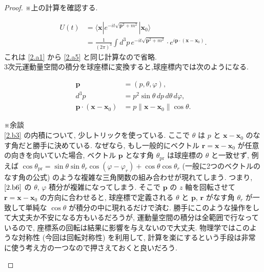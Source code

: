 \documentclass[a4paper,12pt]{article}
\begin{document}
\color{blue}
\begin{proof} ※上の計算を確認する.

\begin{align*}
  U(t) &= \langle \boldsymbol{x} | e^{-it\sqrt{\boldsymbol{p}^2 + m^2}} | \boldsymbol{x}_0 \rangle \tag{2-1.b1} \\
      &= \frac{1}{(2\pi)^3} \int d^3p \, e^{-it\sqrt{\boldsymbol{p}^2 + m^2}} \cdot e^{i\boldsymbol{p} \cdot (\boldsymbol{x} - \boldsymbol{x}_0)}. \tag{2-1.b2}
\end{align*}
これは \eqref{2.a1} から \eqref{2.a5} と同じ計算なので省略. \\
3次元運動量空間の積分を球座標に変換すると,球座標内では次のようになる.

\begin{align*}
  \boldsymbol{p} &= (p, \theta, \varphi), \tag{2-1.b3}\\
  d^3p &= p^2 \sin \theta \, dp \, d\theta \, d\varphi, \tag{2-1.b4}\\
  \boldsymbol{p} \cdot (\boldsymbol{x} - \boldsymbol{x}_0) &= p \| \boldsymbol{x} - \boldsymbol{x}_0 \| \cos \theta. \label{2.b3}\tag{2-1.b5}
\end{align*}

\begin{framed}
※余談\\
\eqref{2.b3} の内積について, 少しトリックを使っている. ここで $\theta$ は $p$ と $\boldsymbol{x} - \boldsymbol{x}_0$ のなす角だと勝手に決めている. なぜなら, もし一般的にベクトル $\boldsymbol{r} = \boldsymbol{x} - \boldsymbol{x}_0$ が任意の向きを向いていた場合, ベクトル $\boldsymbol{p}$ となす角 $\theta_{\textrm{pr}}$ は球座標の $\theta$ と一致せず, 例えば $\cos\theta_{\textrm{pr}} = \sin\theta \sin\theta_r \cos(\varphi - \varphi_r) + \cos\theta\cos\theta_r$ (一般に2つのベクトルのなす角の公式) のような複雑な三角関数の組み合わせが現れてしまう. つまり, $\eqref{2.b6}$ の $\theta$, $\varphi$ 積分が複雑になってしまう. そこで $\boldsymbol{p}$ の $z$ 軸を回転させて $\boldsymbol{r} = \boldsymbol{x} - \boldsymbol{x}_0$ の方向に合わせると, 球座標で定義される $\theta$ と $\boldsymbol{p}$, $\boldsymbol{r}$ がなす角 $\theta_r$ が一致して単純な $\cos\theta$ が積分の中に現れるだけで済む. 勝手にこのような操作をして大丈夫か不安になる方もいるだろうが, 運動量空間の積分は全範囲で行なっているので, 座標系の回転は結果に影響を与えないので大丈夫. 物理学ではこのような対称性 (今回は回転対称性) を利用して, 計算を楽にするという手段は非常に使う考え方の一つなので押さえておくと良いだろう. 
\end{framed}


\end{proof}
\end{document}
